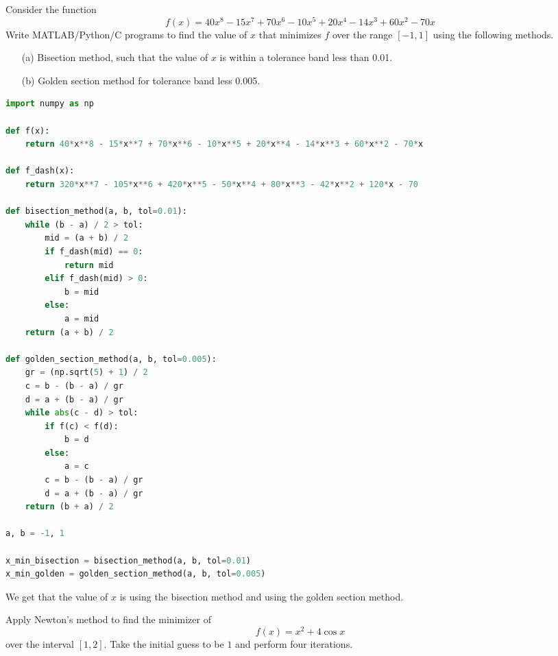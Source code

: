\documentclass{article}
\begin{document}
\thispagestyle{empty}

\titleBC

\begin{question*}[1]    
	Consider the function 
	\[
		f(x) = 40x^8 - 15x^7 + 70x^6 - 10x^5 + 20x^4 - 14x^3 + 60x^2 - 70x
	\]
	Write MATLAB/Python/C programs to find the value of \( x \) that minimizes \( f \) over the range \([-1,1]\) using the following methods.

	\begin{itemize}
	    \item[(a)] Bisection method, such that the value of \( x \) is within a tolerance band less than 0.01.
	    \item[(b)] Golden section method for tolerance band less 0.005.
	\end{itemize}
\end{question*}

\begin{lstlisting}[language=python]
import numpy as np

def f(x):
    return 40*x**8 - 15*x**7 + 70*x**6 - 10*x**5 + 20*x**4 - 14*x**3 + 60*x**2 - 70*x

def f_dash(x):
    return 320*x**7 - 105*x**6 + 420*x**5 - 50*x**4 + 80*x**3 - 42*x**2 + 120*x - 70

def bisection_method(a, b, tol=0.01):
    while (b - a) / 2 > tol:
        mid = (a + b) / 2
        if f_dash(mid) == 0:
            return mid
        elif f_dash(mid) > 0:
            b = mid
        else:
            a = mid
    return (a + b) / 2

def golden_section_method(a, b, tol=0.005):
    gr = (np.sqrt(5) + 1) / 2
    c = b - (b - a) / gr
    d = a + (b - a) / gr
    while abs(c - d) > tol:
        if f(c) < f(d):
            b = d
        else:
            a = c
        c = b - (b - a) / gr
        d = a + (b - a) / gr
    return (b + a) / 2

a, b = -1, 1

x_min_bisection = bisection_method(a, b, tol=0.01)
x_min_golden = golden_section_method(a, b, tol=0.005)
\end{lstlisting}

We get that the value of $x$ is  using the bisection method and  using the golden section method.

\clearpage

\begin{question*}[2]
    Apply Newton's method to find the minimizer of 
    \[
        f(x) = x^2 + 4 \cos x
    \]
    over the interval $[1, 2]$. Take the initial guess to be $1$ and perform four iterations.
\end{question*}
\end{document}

